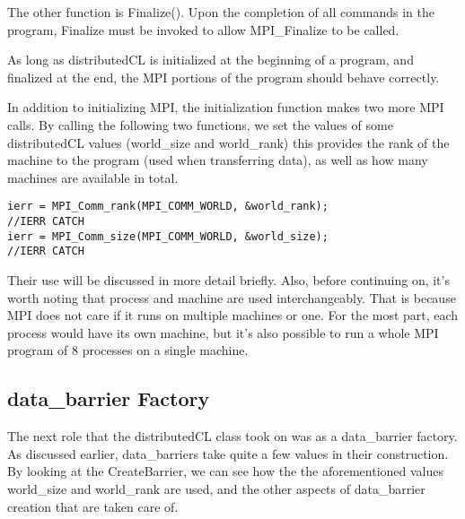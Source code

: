 \documentclass[../thesis.tex]{subfiles}
\begin{document}
    The other function is Finalize(). Upon the completion of all commands in the program, Finalize must be invoked to allow MPI\_Finalize to be called.

    As long as distributedCL is initialized at the beginning of a program, and finalized at the end, the MPI portions of the program should behave correctly.

    In addition to initializing MPI, the initialization function makes two more MPI calls. By calling the following two functions, we set the values of some distributedCL values (world\_size and world\_rank) this provides the rank of the machine to the program (used when transferring data), as well as how many machines are available in total.

    \lstset{language=cpp}
    \begin{lstlisting}[tabsize=2]
ierr = MPI_Comm_rank(MPI_COMM_WORLD, &world_rank);
//IERR CATCH
ierr = MPI_Comm_size(MPI_COMM_WORLD, &world_size);
//IERR CATCH
    \end{lstlisting}

    Their use will be discussed in more detail briefly. Also, before continuing on, it's worth noting that process and machine are used interchangeably. That is because MPI does not care if it runs on multiple machines or one. For the most part, each process would have its own machine, but it's also possible to run a whole MPI program of 8 processes on a single machine.


\subsection{data\_barrier Factory} %
\label{sub:data_barrier_factory}
    The next role that the distributedCL class took on was as a data\_barrier factory. As discussed earlier, data\_barriers take quite a few values in their construction. By looking at the CreateBarrier, we can see how the the aforementioned values world\_size and world\_rank are used, and the other aspects of data\_barrier creation that are taken care of.
\end{document}
